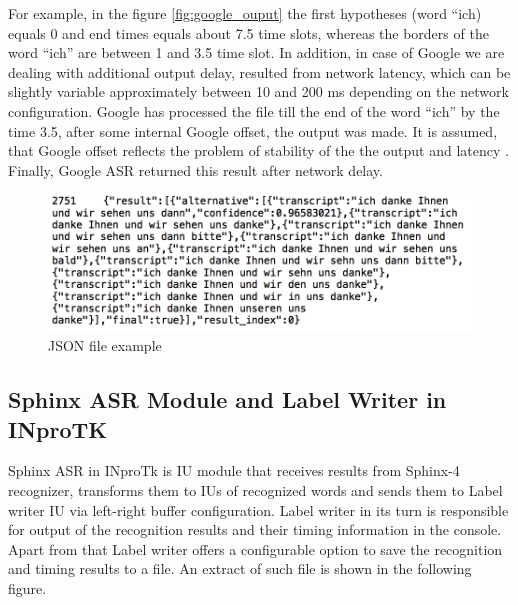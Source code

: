For example, in the figure  \ref {fig:google_ouput} the first hypotheses (word
``ich) equals 0 and end times equals about 7.5 time slots, whereas the borders of the word
``ich'' are between 1 and 3.5 time slot. In addition, in case of Google we are dealing with additional output delay,
resulted from network latency, which can be slightly variable approximately
between 10 and 200 ms depending on the network configuration. Google has
processed the file till the end of the word ``ich'' by the time 3.5, after some internal Google offset, the output was made.
It is assumed, that Google offset reflects the problem of stability of the
the output and latency \parencite {mcgrawgrauenstein2012}. Finally, Google ASR returned this result after 
network delay.  
 \begin{figure}[htbp]
  \centering
   \includegraphics[width=1\textwidth]{images/json_extr.png}
    \caption{JSON file example}
      \label{fig:json_ouput}
\end{figure}
\subsection {Sphinx ASR Module and Label Writer in INproTK}
Sphinx ASR in INproTk is IU module that receives results from Sphinx-4
recognizer, transforms them to IUs of recognized words and sends them
to Label writer IU via left-right buffer configuration.   Label writer in its turn
is responsible for output of the recognition results and  their timing
information in the console. Apart from that Label writer  offers a configurable
option to save the recognition and timing results to a file. An extract of such
file is shown in the following figure. 


